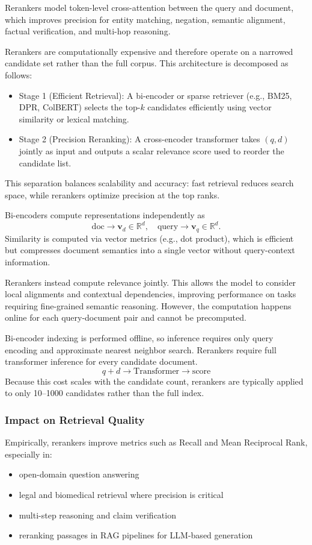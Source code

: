 Rerankers model token-level cross-attention between the query and document, which improves precision for entity matching, negation, semantic alignment, factual verification, and multi-hop reasoning.

Rerankers are computationally expensive and therefore operate on a narrowed candidate set rather than the full corpus. This architecture is decomposed as follows:
\begin{itemize}
    \item Stage 1 (Efficient Retrieval): A bi-encoder or sparse retriever (e.g., BM25, DPR, ColBERT) selects the top-$k$ candidates efficiently using vector similarity or lexical matching.
    \item Stage 2 (Precision Reranking): A cross-encoder transformer takes $(q, d)$ jointly as input and outputs a scalar relevance score used to reorder the candidate list.
\end{itemize}

This separation balances scalability and accuracy: fast retrieval reduces search space, while rerankers optimize precision at the top ranks.


Bi-encoders compute representations independently as
\[
\text{doc} \rightarrow \mathbf{v}_d \in \mathbb{R}^d, \quad \text{query} \rightarrow \mathbf{v}_q \in \mathbb{R}^d.
\]
Similarity is computed via vector metrics (e.g., dot product), which is efficient but compresses document semantics into a single vector without query-context information.

Rerankers instead compute relevance jointly. This allows the model to consider local alignments and contextual dependencies, improving performance on tasks requiring fine-grained semantic reasoning. However, the computation happens online for each query-document pair and cannot be precomputed.


Bi-encoder indexing is performed offline, so inference requires only query encoding and approximate nearest neighbor search. Rerankers require full transformer inference for every candidate document.
\[
q + d \rightarrow \text{Transformer} \rightarrow \text{score}
\]
Because this cost scales with the candidate count, rerankers are typically applied to only 10--1000 candidates rather than the full index.

\subsubsection*{Impact on Retrieval Quality}

Empirically, rerankers improve metrics such as Recall and Mean Reciprocal Rank, especially in:
\begin{itemize}
    \item open-domain question answering
    \item legal and biomedical retrieval where precision is critical
    \item multi-step reasoning and claim verification
    \item reranking passages in RAG pipelines for LLM-based generation
\end{itemize}


